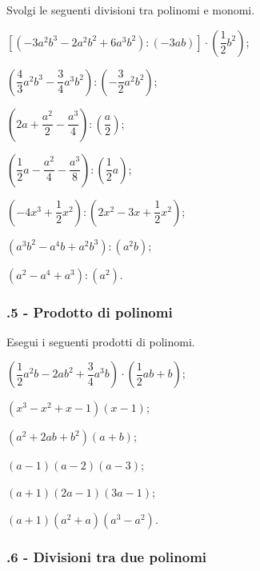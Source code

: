 \begin{esercizio}
\label{ese:11.22} %
 Svolgi le seguenti divisioni tra polinomi e monomi.

\begin{enumeratea}
 \item $\left[\left(-3a^{2}b^{3}-2a^{2}b^{2}+6a^{3}b^{2}\right):(-3{ab})\right]\cdot\left(\dfrac{1}{2}b^{2}\right)$;
 \item $\left(\dfrac{4}{3}a^{2}b^{3}-\dfrac{3}{4}a^{3}b^{2}\right):\left(-{\dfrac{3}{2}a^{2}b^{2}}\right)$;
 \item $\left(2a+\dfrac{a^{2}}{2}-\dfrac{a^{3}}{4}\right):\left(\dfrac{a}{2}\right)$;
 \item $\left(\dfrac{1}{2}a-\dfrac{a^{2}}{4}-\dfrac{a^{3}}{8}\right):\left(\dfrac{1}{2}a\right)$;
 \item $\left(-4x^{3}+\dfrac{1}{2}x^{2}\right):\left(2x^{2}-3x+\dfrac{1}{2}x^{2}\right)$;
 \item $\left(a^{3}b^{2}-a^{4}b+a^{2}b^{3}\right):\left(a^{2}b\right)$;
 \item $\left(a^{2}-a^{4}+a^{3}\right):\left(a^{2}\right)$.
\end{enumeratea}
\end{esercizio}

\subsubsection*{\thechapter.5 - Prodotto di polinomi}
\begin{esercizio}
\label{ese:11.23} %
Esegui i seguenti prodotti di polinomi.
\begin{multicols}{2}
\begin{enumeratea}
 \item $\left(\dfrac{1}{2}a^{2}b-2{ab}^{2}+\dfrac{3}{4}a^{3}b\right)\cdot\left(\dfrac{1}{2}{ab}+b\right)$;
 \item $\left(x^{3}-x^{2}+x-1\right)({x}-1)$;
 \item $\left(a^{2}+2{ab}+b^{2}\right)(a+b)$;
 \item $(a-1)(a-2)(a-3)$;
 \item $(a+1)(2a-1)(3a-1)$;
 \item $(a+1)\left(a^{2}+a\right)\left(a^{3}-a^{2}\right)$.
\end{enumeratea}
\end{multicols}
\end{esercizio}

\subsubsection*{\thechapter.6 - Divisioni tra due polinomi}

